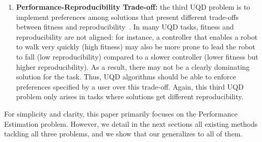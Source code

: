 \begin{enumerate}
    \item \textbf{Performance-Reproducibility Trade-off:} the third UQD problem is to implement preferences among solutions that present different trade-offs between fitness and reproducibility~\cite{flageat2024exploring}.
    In many UQD tasks, fitness and reproducibility are not aligned: for instance, a controller that enables a robot to walk very quickly (high fitness) may also be more prone to lead the robot to fall (low reproducibility) compared to a slower controller (lower fitness but higher reproducibility). As a result, there may not be a clearly dominating solution for the task. 
    Thus, UQD algorithms should be able to enforce preferences specified by a user over this trade-off. 
    Again, this third UQD problem only arises in tasks where solutions get different reproducibility. 
\end{enumerate}
For simplicity and clarity, this paper primarily focuses on the Performance Estimation problem. However, we detail in the next sections all existing methods tackling all three problems, and we show that our \framework{} generalizes to all of them. 

